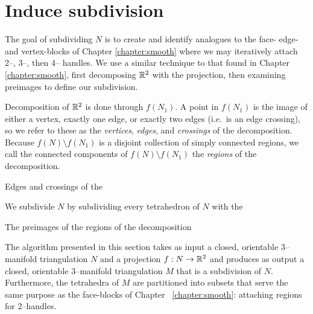 \section{Induce subdivision}

The goal of subdividing $N$ is to create and identify analogues to the face- edge- and vertex-blocks of Chapter \ref{chapter:smooth} where we may iteratively attach 2--, 3--, then 4-- handles.
We use a similar technique to that found in Chapter \ref{chapter:smooth}, first decomposing $\mathbb{R}^2$ with the projection, then examining preimages to define our subdivision.

Decomposition of $\mathbb{R}^2$ is done through $f(N_1)$.
A point in $f(N_1)$ is the image of either a vertex, exactly one edge, or exactly two edges (i.e.\ is an edge crossing), so we refer to these as the \emph{vertices}, \emph{edges}, and \emph{crossings} of the decomposition.
Because $f(N)\setminus f(N_1)$  is a disjoint collection of simply connected regions, we call the connected components of $f(N)\setminus f(N_1)$ the \emph{regions} of the decomposition.

Edges and crossings of the 

We subdivide $N$ by subdividing every tetrahedron of $N$ with the 

The preimages of the regions of the decomposition 

The algorithm presented in this section takes as input a closed, orientable 3--manifold triangulation $N$ and a projection $f:N\to\mathbb{R}^2$ and produces as output a closed, orientable 3--manifold triangulation $M$ that is a subdivision of $N$.
Furthermore, the tetrahedra of $M$ are partitioned into subsets that serve the same purpose as the face-blocks of Chapter ~\ref{chapter:smooth}: attaching regions for 2--handles.
